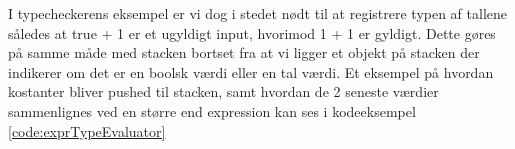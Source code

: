 I typecheckerens eksempel er vi dog i stedet nødt til at registrere typen af tallene således at true + 1 er et ugyldigt input, hvorimod 1 + 1 er gyldigt. Dette gøres på samme måde med stacken bortset fra at vi ligger et objekt på stacken der indikerer om det er en boolsk værdi eller en tal værdi. Et eksempel på hvordan kostanter bliver pushed til stacken, samt hvordan de 2 seneste værdier sammenlignes ved en større end expression kan ses i kodeeksempel \ref{code:exprTypeEvaluator}


